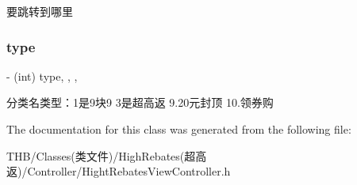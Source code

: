 要跳转到哪里 \mbox{\label{interface_hight_rebates_view_controller_a161b729c6778d8f7fb719025b15d9c1f}} 
\subsubsection{\texorpdfstring{type}{type}}
{\footnotesize\ttfamily -\/ (int) type\hspace{0.3cm}{\ttfamily [read]}, {\ttfamily [write]}, {\ttfamily [nonatomic]}, {\ttfamily [assign]}}

分类名类型：1是9块9 3是超高返 9.\+20元封顶 10.领券购 

The documentation for this class was generated from the following file\+:\begin{DoxyCompactItemize}
\item 
T\+H\+B/\+Classes(类文件)/\+High\+Rebates(超高返)/\+Controller/Hight\+Rebates\+View\+Controller.\+h\end{DoxyCompactItemize}
